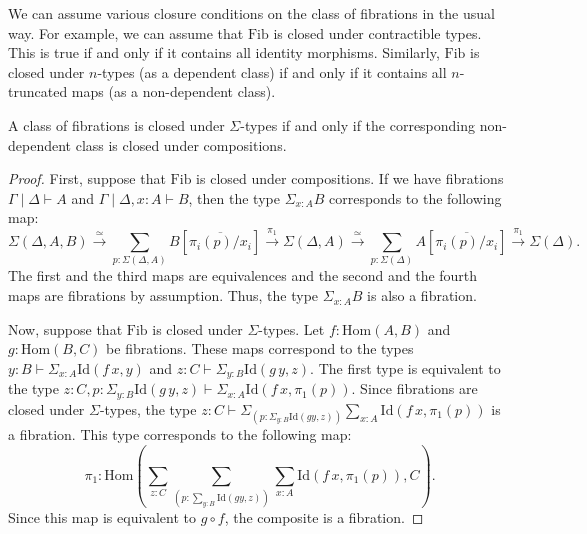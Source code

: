 \documentclass[reqno]{amsart}
\theoremstyle{definition}
\theoremstyle{remark}
\newcommand{\fs}[1]{\mathrm{#1}}
\newcommand{\Hom}{\fs{Hom}}
\newcommand{\Id}{\fs{Id}}
\newcommand{\Fib}{\fs{Fib}}
\numberwithin{figure}{section}
\begin{document}
We can assume various closure conditions on the class of fibrations in the usual way.
For example, we can assume that $\Fib$ is closed under contractible types.
This is true if and only if it contains all identity morphisms.
Similarly, $\Fib$ is closed under $n$-types (as a dependent class) if and only if it contains all $n$-truncated maps (as a non-dependent class).

\begin{prop}
A class of fibrations is closed under $\Sigma$-types if and only if the corresponding non-dependent class is closed under compositions.
\end{prop}
\begin{proof}
First, suppose that $\Fib$ is closed under compositions.
If we have fibrations $\Gamma \mid \Delta \vdash A$ and $\Gamma \mid \Delta, x : A \vdash B$, then the type $\Sigma_{x : A} B$ corresponds to the following map:
\[ \Sigma(\Delta, A, B) \xrightarrow{\simeq} \sum_{p : \Sigma(\Delta, A)} B[\overline{\pi_i(p)/x_i}] \xrightarrow{\pi_1} \Sigma(\Delta, A) \xrightarrow{\simeq} \sum_{p : \Sigma(\Delta)} A[\overline{\pi_i(p)/x_i}] \xrightarrow{\pi_1} \Sigma(\Delta). \]
The first and the third maps are equivalences and the second and the fourth maps are fibrations by assumption.
Thus, the type $\Sigma_{x : A} B$ is also a fibration.

Now, suppose that $\Fib$ is closed under $\Sigma$-types.
Let $f : \Hom(A,B)$ and $g : \Hom(B,C)$ be fibrations.
These maps correspond to the types $y : B \vdash \Sigma_{x : A} \Id(f\,x,y)$ and $z : C \vdash \Sigma_{y : B} \Id(g\,y,z)$.
The first type is equivalent to the type $z : C, p : \Sigma_{y : B} \Id(g\,y,z) \vdash \Sigma_{x : A} \Id(f\,x,\pi_1(p))$.
Since fibrations are closed under $\Sigma$-types, the type $z : C \vdash \Sigma_{(p : \Sigma_{y : B} \Id(g y, z))} \sum_{x : A} \Id(f\,x,\pi_1(p))$ is a fibration.
This type corresponds to the following map:
\[ \pi_1 : \Hom(\sum_{z : C} \sum_{(p : \sum_{y : B} \Id(g y, z))} \sum_{x : A} \Id(f\,x,\pi_1(p)), C). \]
Since this map is equivalent to $g \circ f$, the composite is a fibration.
\end{proof}
\end{document}
